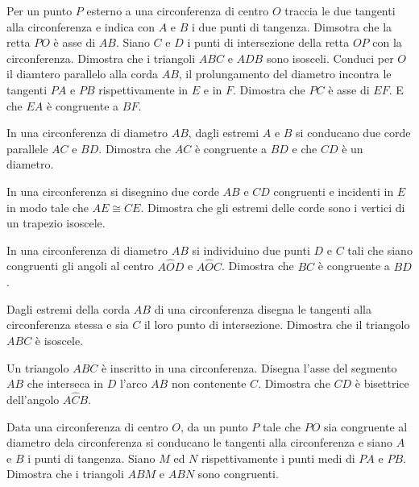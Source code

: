 \begin{multicols}{2}
\begin{esercizio}
\label{ese:5.33}
Per un punto $P$ esterno a una circonferenza di centro $O$ traccia le due tangenti alla circonferenza e indica con $A$ e $B$ i due punti di tangenza. Dimsotra che la retta $PO$ è asse di $AB$. Siano $C$ e $D$ i punti di intersezione della retta $OP$ con la circonferenza. Dimostra che i triangoli $ABC$ e $ADB$ sono isosceli. Conduci per $O$ il diamtero parallelo alla corda $AB$, il prolungamento del diametro incontra le tangenti $PA$ e $PB$ rispettivamente in $E$ e in $F$. Dimostra che $PC$ è asse di $EF$. E che $EA$ è congruente a $BF$.
\end{esercizio}

\begin{esercizio}
\label{ese:5.34}
In una circonferenza di diametro $AB$, dagli estremi $A$ e $B$ si conducano due corde parallele $AC$ e $BD$. Dimostra che $AC$ è congruente a $BD$ e che $CD$ è un diametro.
\end{esercizio}

\begin{esercizio}
\label{ese:5.35}
In una circonferenza si disegnino due corde $AB$ e $CD$ congruenti e incidenti in $E$ in modo tale che $AE\cong CE$. Dimostra che gli estremi delle corde sono i vertici di un trapezio isoscele.
\end{esercizio}

\begin{esercizio}
\label{ese:5.36}
In una circonferenza di diametro $AB$ si individuino due punti $D$ e $C$ tali che siano congruenti gli angoli al centro $A\widehat{O}D$ e $A\widehat{O}C$. Dimostra che $BC$ è congruente a $BD$.
\end{esercizio}

\begin{esercizio}
\label{ese:5.37}
Dagli estremi della corda $AB$ di una circonferenza disegna le tangenti alla circonferenza stessa e sia $C$ il loro punto di intersezione. Dimostra che il triangolo $ABC$ è isoscele.
\end{esercizio}

\begin{esercizio}
\label{ese:5.38}
Un triangolo $ABC$ è inscritto in una circonferenza. Disegna l'asse del segmento $AB$ che interseca in $D$ l'arco $AB$ non contenente $C$. Dimostra che $CD$ è bisettrice dell'angolo $A\widehat{C}B$.
\end{esercizio}

\begin{esercizio}
\label{ese:5.39}
Data una circonferenza di centro $O$, da un punto $P$ tale che $PO$ sia congruente al diametro dela circonferenza si conducano le tangenti alla circonferenza e siano $A$ e $B$ i punti di tangenza. Siano $M$ ed $N$ rispettivamente i punti medi di $PA$ e $PB$. Dimostra che i triangoli $ABM$ e $ABN$ sono congruenti.
\end{esercizio}


\end{multicols}
